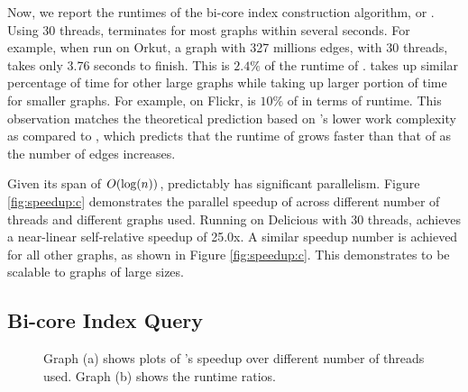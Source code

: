 Now, we report the runtimes of the bi-core index construction algorithm, or . Using 30 threads,  terminates for most graphs within several seconds. For example, when run on Orkut, a graph with 327 millions edges, with 30 threads,  takes only 3.76 seconds to finish. This is $2.4\%$ of the runtime of .  takes up similar percentage of time for other large graphs while taking up larger portion of time for smaller graphs. For example, on Flickr,  is $10\%$ of  in terms of runtime. This observation matches the theoretical prediction based on 's lower work complexity as compared to , which predicts that the runtime of  grows faster than that of   as the number of edges increases.


Given its span of $O(\log(n))$,  predictably has significant parallelism. Figure \ref{fig:speedup:c} demonstrates the parallel speedup of  across different number of threads and different graphs used. Running on Delicious with 30 threads,  achieves a near-linear self-relative speedup of 25.0x. A similar speedup number is achieved for all other graphs, as shown in Figure \ref{fig:speedup:c}. This demonstrates  to be scalable to graphs of large sizes.

\subsection{Bi-core Index Query}\label{sec:exp-index-q}

\begin{figure}%
    \centering
    \qquad
    \caption{Graph (a) shows plots of 's speedup over different number of threads used. Graph (b) shows the runtime ratios.}%
    \label{fig:speedup:q}%
\end{figure}

